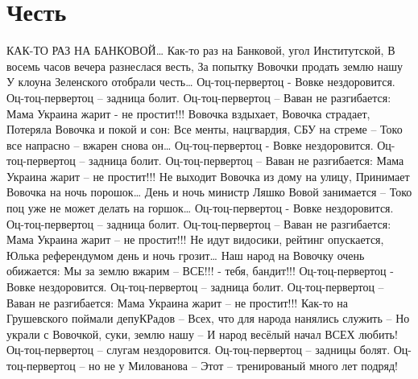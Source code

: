  
 
 
 
 
\chapter{Честь}

КАК-ТО РАЗ НА БАНКОВОЙ…
Как-то раз на Банковой, угол Институтской,
В восемь часов вечера разнеслася весть,
За попытку Вовочки продать землю нашу
У клоуна Зеленского отобрали честь…
Оц-тоц-первертоц - Вовке нездоровится.
Оц-тоц-первертоц – задница болит.
Оц-тоц-первертоц – Ваван не разгибается:
Мама Украина жарит - не простит!!!
Вовочка вздыхает, Вовочка страдает,
Потеряла Вовочка и покой и сон:
Все менты, нацгвардия, СБУ на стреме –
Токо все напрасно – вжарен снова он…
Оц-тоц-первертоц - Вовке нездоровится.
Оц-тоц-первертоц – задница болит.
Оц-тоц-первертоц – Ваван не разгибается:
Мама Украина жарит – не простит!!!
Не выходит Вовочка из дому на улицу,
Принимает Вовочка на ночь порошок…
День и ночь министр Ляшко Вовой занимается –
Токо поц уже не может делать на горшок…
Оц-тоц-первертоц - Вовке нездоровится.
Оц-тоц-первертоц – задница болит.
Оц-тоц-первертоц – Ваван не разгибается:
Мама Украина жарит – не простит!!!
Не идут видосики, рейтинг опускается,
Юлька референдумом день и ночь грозит…
Наш народ на Вовочку очень обижается:
Мы за землю вжарим – ВСЕ!!! - тебя, бандит!!!
Оц-тоц-первертоц - Вовке нездоровится.
Оц-тоц-первертоц – задница болит.
Оц-тоц-первертоц – Ваван не разгибается:
Мама Украина жарит – не простит!!!
Как-то на Грушевского поймали депуКРадов –
Всех, что для народа нанялись служить –
Но украли с Вовочкой, суки, землю нашу –
И народ весёлый начал ВСЕХ любить!
Оц-тоц-первертоц – слугам нездоровится.
Оц-тоц-первертоц – задницы болят.
Оц-тоц-первертоц – но не у Милованова –
Этот – тренированый много лет подряд!
